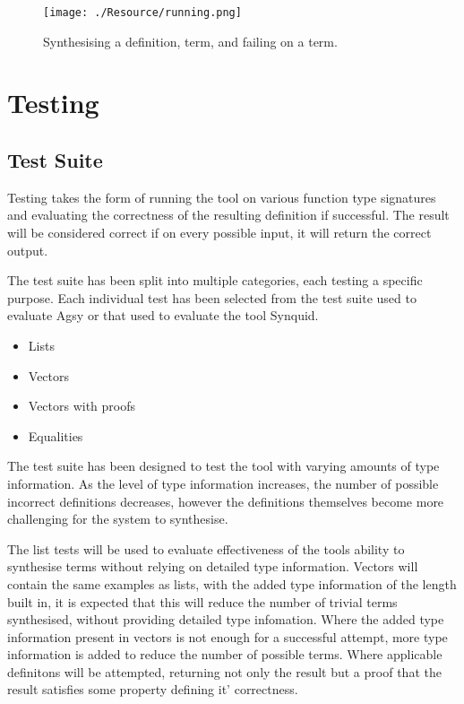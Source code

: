 \documentclass[a4paper]{article}
\begin{document}
\begin{center}
\begin{figure}[htbp]
\centering
\texttt{[image: ./Resource/running.png]}
\caption{Synthesising a definition, term, and failing on a term.}
\end{figure}
\end{center}

\clearpage

\section{Testing}
\label{sec:orgfd7bf85}

\subsection{Test Suite}

Testing takes the form of running the tool on various
function type signatures and evaluating the correctness
of the resulting definition if successful. The result
will be considered correct if on every possible input, it
will return the correct output. 

The test suite has been split into multiple categories, 
each testing a specific purpose. Each individual test 
has been selected from the test suite used to evaluate 
Agsy or that used to evaluate the tool Synquid.


\begin{itemize}
\item Lists
\item Vectors
\item Vectors with proofs
\item Equalities
\end{itemize}

The test suite has been designed to test the tool with varying
amounts of type information. As the level of type information
increases, the number of possible incorrect definitions decreases,
however the definitions themselves become more challenging for the
system to synthesise.

The list tests will be used to evaluate effectiveness of the
tools ability to synthesise terms without relying on detailed
type information. Vectors will contain the same examples as lists,
with the added type information of the length built in, it is expected that
this will reduce the number of trivial terms synthesised, without providing
detailed type infomation. Where the added type information present in
vectors is not enough for a successful attempt, more type information is added
to reduce the number of possible terms. Where applicable definitons will be
attempted, returning not only the result but a proof that the result satisfies
some property defining it' correctness. 
\end{document}
